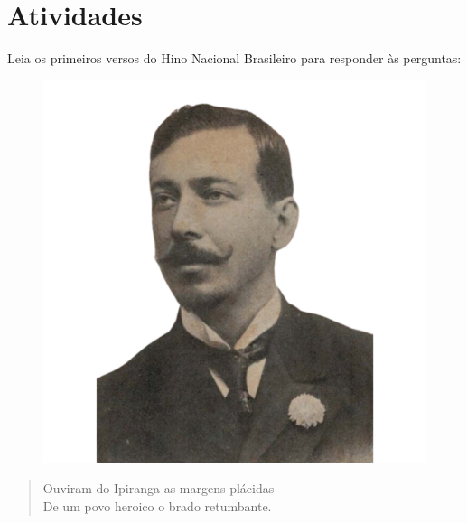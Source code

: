 
\section*{Atividades}

Leia os primeiros versos do Hino Nacional Brasileiro para responder às perguntas:

\begin{myquote} 

\begin{figure}[H]
\centering
\includegraphics[scale=0.25]{./imgSAEB_7_POR/media/image51.png}
\end{figure}

\begin{verse}
Ouviram do Ipiranga as margens plácidas \\
De um povo heroico o brado retumbante.
\end{verse}


\end{myquote}

